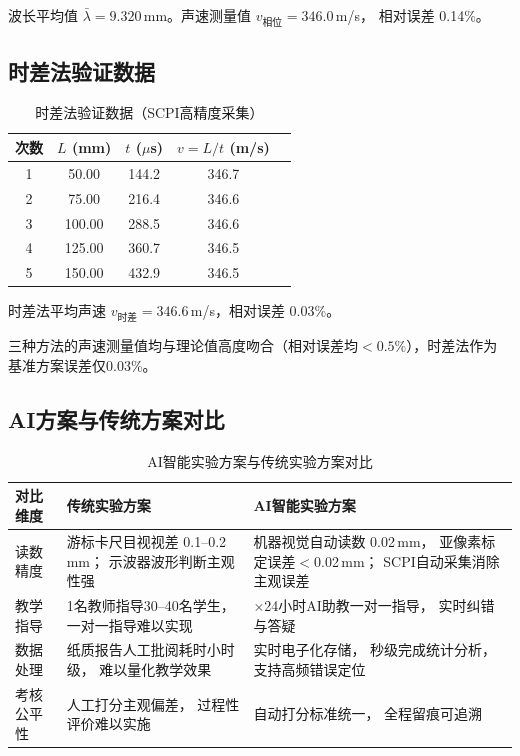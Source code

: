 波长平均值 $\bar{\lambda}=9.320$\,mm。声速测量值 $v_{\text{相位}}=346.0$\,m/s，
相对误差 0.14\%。

\subsection{时差法验证数据}

\begin{table}[h]
    \centering
    \caption{时差法验证数据（SCPI高精度采集）}
    \begin{tabular}{|c|c|c|c|c|}
        \hline
        次数 & $L$ (mm) & $t$ ($\mu$s) & $v=L/t$ (m/s) \\
        \hline
        1 & 50.00 & 144.2 & 346.7 \\
        2 & 75.00 & 216.4 & 346.6 \\
        3 & 100.00 & 288.5 & 346.6 \\
        4 & 125.00 & 360.7 & 346.5 \\
        5 & 150.00 & 432.9 & 346.5 \\
        \hline
    \end{tabular}
\end{table}

时差法平均声速 $v_{\text{时差}}=346.6$\,m/s，相对误差 0.03\%。

三种方法的声速测量值均与理论值高度吻合（相对误差均$<0.5\%$），时差法作为
基准方案误差仅0.03\%。

\subsection{AI方案与传统方案对比}

\begin{table}[h]
    \centering
    \caption{AI智能实验方案与传统实验方案对比}
    \begin{tabular}{|>{\centering}p{2cm}|>{\centering}p{5.5cm}|>{\centering}p{5.5cm}|}
        \hline
        对比维度 & 传统实验方案 & AI智能实验方案 \\
        \hline
        读数精度 & 游标卡尺目视视差 0.1--0.2\,mm；
        示波器波形判断主观性强 & 机器视觉自动读数 0.02\,mm，
        亚像素标定误差$<$0.02\,mm；
        SCPI自动采集消除主观误差 \\
        \hline
        教学指导 & 1名教师指导30--40名学生，
        一对一指导难以实现 & 7$\times$24小时AI助教一对一指导，
        实时纠错与答疑 \\
        \hline
        数据处理 & 纸质报告人工批阅耗时小时级，
        难以量化教学效果 & 实时电子化存储，
        秒级完成统计分析，
        支持高频错误定位 \\
        \hline
        考核公平性 & 人工打分主观偏差，
        过程性评价难以实施 & 自动打分标准统一，
        全程留痕可追溯 \\
        \hline
    \end{tabular}
\end{table}

